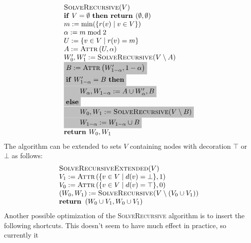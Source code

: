 \documentclass{article}
\begin{document}
\begin{equation*}
\begin{array}{l}
\textsc{SolveRecursive}(V) \\ 
\text{\textbf{if} }V=\emptyset \text{ \textbf{then return }}(\emptyset
,\emptyset ) \\ 
m:=\min (\{r(v)\mid v\in V\}) \\ 
\alpha := m \bmod 2 \\ 
U:=\{v\in V\mid r(v)=m\} \\ 
A:=\text{\textsc{Attr}}\left( U,\alpha \right)  \\ 
W_{0}^{\prime },W_{1}^{\prime }:=\text{\textsc{SolveRecursive(}}V\setminus A%
\text{)} \\
\colorbox{lightgray}{$
B:=\text{\textsc{Attr}}\left( W_{1-\alpha }^{\prime },1-\alpha \right) $}\\ 
\colorbox{lightgray}{$
\text{\textbf{if} }W_{1-\alpha }^{\prime }=B\text{ \textbf{then}} $}\\ 
\colorbox{lightgray}{$
\qquad W_{\alpha },W_{1-\alpha }:=A\cup W_{\alpha }^{\prime },B $}\\ 
\colorbox{lightgray}{$
\text{\textbf{else}} $}\\ 
\colorbox{lightgray}{$
\qquad W_{0},W_{1}:=\textsc{SolveRecursive}(V \setminus B)$}\\ 
\colorbox{lightgray}{$
\qquad W_{1-\alpha }:=W_{1-\alpha }\cup B $}\\ 
\text{\textbf{return }}W_{0},W_{1}
\end{array}
\end{equation*}
The algorithm can be extended to sets $V$ containing nodes with decoration $%
\top $ or $\bot $ as follows:%
\begin{equation*}
\begin{array}{l}
\textsc{SolveRecursiveExtended}(V) \\ 
V_{1}:=\textsc{Attr}\left( \{v\in V\mid d(v) = \bot \},1\right) \\ 
V_{0}:=\textsc{Attr}\left( \{v\in V\mid d(v) = \top \},0\right) \\ 
\left( W_{0},W_{1}\right) :=\text{\textsc{SolveRecursive(}}V\setminus
(V_{0}\cup V_{1})\text{\textsc{)}} \\ 
\text{\textbf{return }}\left( W_{0}\cup V_{1},W_{0}\cup V_{1}\right)%
\end{array}
\end{equation*}
Another possible optimization of the \textsc{SolveRecursive} algorithm is to insert the
following shortcuts. This doesn't seem to have much effect in practice, so currently it
\end{document}
